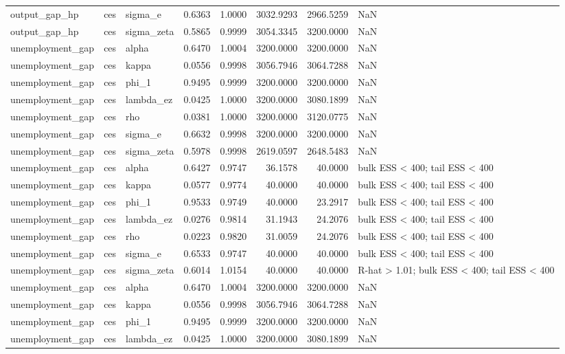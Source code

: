 \begin{tabular}{lllrrrrl}
output\_gap\_hp & ces & sigma\_e & 0.6363 & 1.0000 & 3032.9293 & 2966.5259 & NaN \\
output\_gap\_hp & ces & sigma\_zeta & 0.5865 & 0.9999 & 3054.3345 & 3200.0000 & NaN \\
unemployment\_gap & ces & alpha & 0.6470 & 1.0004 & 3200.0000 & 3200.0000 & NaN \\
unemployment\_gap & ces & kappa & 0.0556 & 0.9998 & 3056.7946 & 3064.7288 & NaN \\
unemployment\_gap & ces & phi\_1 & 0.9495 & 0.9999 & 3200.0000 & 3200.0000 & NaN \\
unemployment\_gap & ces & lambda\_ez & 0.0425 & 1.0000 & 3200.0000 & 3080.1899 & NaN \\
unemployment\_gap & ces & rho & 0.0381 & 1.0000 & 3200.0000 & 3120.0775 & NaN \\
unemployment\_gap & ces & sigma\_e & 0.6632 & 0.9998 & 3200.0000 & 3200.0000 & NaN \\
unemployment\_gap & ces & sigma\_zeta & 0.5978 & 0.9998 & 2619.0597 & 2648.5483 & NaN \\
unemployment\_gap & ces & alpha & 0.6427 & 0.9747 & 36.1578 & 40.0000 & bulk ESS < 400; tail ESS < 400 \\
unemployment\_gap & ces & kappa & 0.0577 & 0.9774 & 40.0000 & 40.0000 & bulk ESS < 400; tail ESS < 400 \\
unemployment\_gap & ces & phi\_1 & 0.9533 & 0.9749 & 40.0000 & 23.2917 & bulk ESS < 400; tail ESS < 400 \\
unemployment\_gap & ces & lambda\_ez & 0.0276 & 0.9814 & 31.1943 & 24.2076 & bulk ESS < 400; tail ESS < 400 \\
unemployment\_gap & ces & rho & 0.0223 & 0.9820 & 31.0059 & 24.2076 & bulk ESS < 400; tail ESS < 400 \\
unemployment\_gap & ces & sigma\_e & 0.6533 & 0.9747 & 40.0000 & 40.0000 & bulk ESS < 400; tail ESS < 400 \\
unemployment\_gap & ces & sigma\_zeta & 0.6014 & 1.0154 & 40.0000 & 40.0000 & R-hat > 1.01; bulk ESS < 400; tail ESS < 400 \\
unemployment\_gap & ces & alpha & 0.6470 & 1.0004 & 3200.0000 & 3200.0000 & NaN \\
unemployment\_gap & ces & kappa & 0.0556 & 0.9998 & 3056.7946 & 3064.7288 & NaN \\
unemployment\_gap & ces & phi\_1 & 0.9495 & 0.9999 & 3200.0000 & 3200.0000 & NaN \\
unemployment\_gap & ces & lambda\_ez & 0.0425 & 1.0000 & 3200.0000 & 3080.1899 & NaN \\

\end{tabular}
